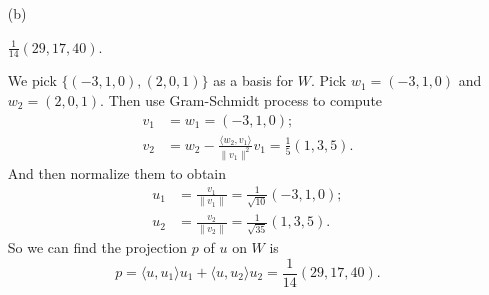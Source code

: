 \begin{Exercise}
	\begin{enumerate}[(a)]
		\item[(b)]
		\begin{answer}
			$\frac{1}{14}(29,17,40)$.
		\end{answer}
		\begin{solution}
			We pick $\{(-3,1,0), (2,0,1)\}$ as a basis for $W$. Pick $w_1 = (-3,1,0)$ and $w_2 = (2,0,1)$. Then use Gram-Schmidt process to compute
			\begin{align*}
			v_1 &= w_1 = (-3,1,0); \\
			v_2 &= w_2-\frac{\langle w_2, v_1 \rangle}{\|v_1\|^2} v_1 = \frac{1}{5}(1,3,5).
			\end{align*}
			And then normalize them to obtain
			\begin{align*}
			u_1 &= \frac{v_1}{\|v_1\|} = \frac{1}{\sqrt{10}}(-3,1,0); \\
			u_2 &= \frac{v_2}{\|v_2\|} = \frac{1}{\sqrt{35}}(1,3,5).
			\end{align*}
			So we can find the projection $p$ of $u$ on $W$ is
			$$
			p = \langle u,u_1\rangle u_1 + \langle u,u_2\rangle u_2
			= \frac{1}{14}(29,17,40).
			$$
		\end{solution}
	\end{enumerate}
\end{Exercise}